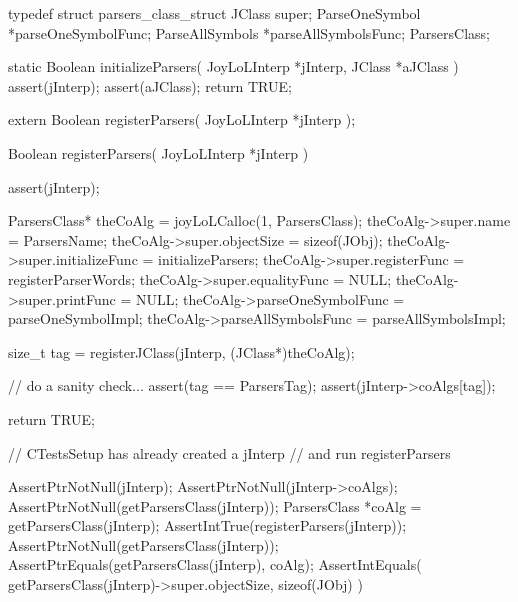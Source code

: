 \startTestSuite[registerParsers]

\startCHeader
typedef struct parsers_class_struct {
  JClass       super;
  ParseOneSymbol  *parseOneSymbolFunc;
  ParseAllSymbols *parseAllSymbolsFunc;
} ParsersClass;
\stopCHeader

\startCCode
static Boolean initializeParsers(
  JoyLoLInterp *jInterp,
  JClass   *aJClass
) {
  assert(jInterp);
  assert(aJClass);
  return TRUE;
}
\stopCCode

\startCHeader
extern Boolean registerParsers(
  JoyLoLInterp *jInterp
);
\stopCHeader
{}

\startCCode
Boolean registerParsers(
  JoyLoLInterp *jInterp
) {
  assert(jInterp);
  
  ParsersClass* theCoAlg          = joyLoLCalloc(1, ParsersClass);
  theCoAlg->super.name            = ParsersName;
  theCoAlg->super.objectSize      = sizeof(JObj);
  theCoAlg->super.initializeFunc  = initializeParsers;
  theCoAlg->super.registerFunc    = registerParserWords;
  theCoAlg->super.equalityFunc    = NULL;
  theCoAlg->super.printFunc       = NULL;
  theCoAlg->parseOneSymbolFunc    = parseOneSymbolImpl;
  theCoAlg->parseAllSymbolsFunc   = parseAllSymbolsImpl;
  
  size_t tag =
    registerJClass(jInterp, (JClass*)theCoAlg);
  
  // do a sanity check...
  assert(tag == ParsersTag);
  assert(jInterp->coAlgs[tag]);
    
  return TRUE;
}
\stopCCode


\startCTest
  // CTestsSetup has already created a jInterp
  // and run registerParsers
  
  AssertPtrNotNull(jInterp);
  AssertPtrNotNull(jInterp->coAlgs);
  AssertPtrNotNull(getParsersClass(jInterp));
  ParsersClass *coAlg = getParsersClass(jInterp);
  AssertIntTrue(registerParsers(jInterp));
  AssertPtrNotNull(getParsersClass(jInterp));
  AssertPtrEquals(getParsersClass(jInterp), coAlg);
  AssertIntEquals(
    getParsersClass(jInterp)->super.objectSize,
    sizeof(JObj)
  )
\stopCTest
\stopTestCase
\stopTestSuite
